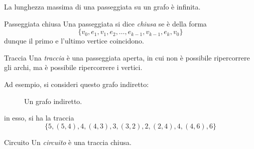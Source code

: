\documentclass[a4paper, 12pt]{report}
\begin{document}
    \begin{framedobs}{}
        La lunghezza massima di una passeggiata su un grafo è infinita.
    \end{framedobs}

    \begin{frameddefn}{Passeggiata chiusa}
        Una passeggiata si dice \textit{chiusa} se è della forma $$\{v_0, e_1, v_1, e_2, \ldots , e_{k - 1}, v_{k - 1}, e_k, v_0\}$$ dunque il primo e l'ultimo vertice coincidono. 
    \end{frameddefn}

    \begin{frameddefn}{Traccia}
        Una \textit{traccia} è una passeggiata aperta, in cui non è possibile ripercorrere gli archi, ma è possibile ripercorrere i vertici.
    \end{frameddefn}

    \begin{example}
        Ad esempio, si consideri questo grafo indiretto:

        \begin{figure}[H]
            \centering
            \caption{Un grafo indiretto.}
        \end{figure}

        in esso, si ha la traccia $$\{5, (5,4), 4, (4,3), 3, (3, 2), 2, (2,4), 4, (4, 6), 6\}$$
    \end{example}

    \begin{frameddefn}{Circuito}
        Un \textit{circuito} è una traccia chiusa.
    \end{frameddefn}
\end{document}
